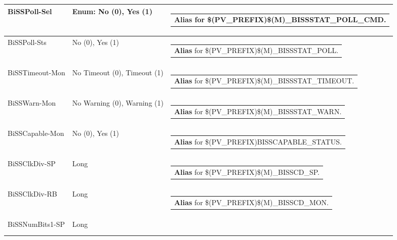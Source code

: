 \documentclass[openany]{article}
\begin{document}
\begin{longtable}{| m{4.5cm} m{2.5cm}  m{8.5cm} |}
        BiSSPoll-Sel & Enum: No (0), Yes (1) & \begin{tabular}{@{}m{6cm}@{}}
                \textbf{\color{blue} Alias} for \$(PV\_PREFIX)\$(M)\_BISSSTAT\_POLL\_CMD.
            \end{tabular} \hypertarget{}{}\\ \hline
        BiSSPoll-Sts & No (0), Yes (1) & \begin{tabular}{@{}m{6cm}@{}}
                \textbf{\color{blue} Alias} for \$(PV\_PREFIX)\$(M)\_BISSSTAT\_POLL.
            \end{tabular} \hypertarget{pv:biss-timeout-mon}{}\\ \hline
        BiSSTimeout-Mon & No Timeout (0), Timeout (1) & \begin{tabular}{@{}m{6cm}@{}}
                \textbf{\color{blue} Alias} for \$(PV\_PREFIX)\$(M)\_BISSSTAT\_TIMEOUT.
            \end{tabular} \hypertarget{pv:biss-warn-mon}{}\\ \hline
        BiSSWarn-Mon & No Warning (0), Warning (1) & \begin{tabular}{@{}m{6cm}@{}}
                \textbf{\color{blue} Alias} for \$(PV\_PREFIX)\$(M)\_BISSSTAT\_WARN.
            \end{tabular} \hypertarget{pv:biss-capable-mon}{}\\ \hline
        BiSSCapable-Mon & No (0), Yes (1) & \begin{tabular}{@{}m{6cm}@{}}
                \textbf{\color{blue} Alias} for \$(PV\_PREFIX)BISSCAPABLE\_STATUS.
            \end{tabular} \hypertarget{pv:biss-clk-div}{}\\ \hline
        BiSSClkDiv-SP & Long & \begin{tabular}{@{}m{6cm}@{}}
                \textbf{\color{blue} Alias} for \$(PV\_PREFIX)\$(M)\_BISSCD\_SP.
            \end{tabular} \hypertarget{}{}\\ \hline
        BiSSClkDiv-RB & Long & \begin{tabular}{@{}m{6cm}@{}}
                \textbf{\color{blue} Alias} for \$(PV\_PREFIX)\$(M)\_BISSCD\_MON.
            \end{tabular} \hypertarget{pv:biss-num-bits-1}{}\\ \hline
        BiSSNumBits1-SP & Long & \begin{tabular}{@{}m{6cm}@{}}

\end{tabular}
\end{longtable}
\end{document}
